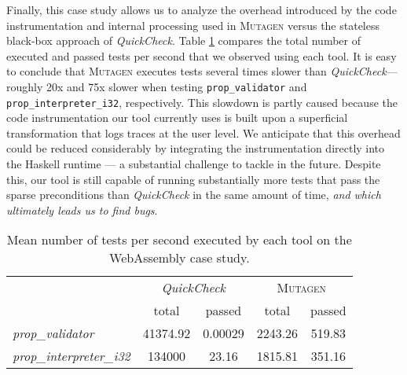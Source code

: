\documentclass[sigconf, anonymous, review]{acmart}
\newcommand{\quickcheck}{\textit{QuickCheck}\xspace}
\newcommand{\mutagen}{\textsc{Mutagen}\xspace}
\begin{document}
Finally, this case study allows us to analyze the overhead introduced by the
code instrumentation and internal processing used in \mutagen versus the
stateless black-box approach of \quickcheck.
%
Table \ref{table:wasm:overhead} compares the total number of executed and passed
tests per second that we observed using each tool.
%
It is easy to conclude that \mutagen executes tests several times slower than
\quickcheck --- roughly 20x and 75x slower when testing \texttt{prop\_validator}
and \texttt{prop\_interpreter\_i32}, respectively.
%
This slowdown is partly caused because the code instrumentation our tool
currently uses is built upon a superficial transformation that logs traces at
the user level.
%
We anticipate that this overhead could be reduced considerably by integrating
the instrumentation directly into the Haskell runtime --- a substantial
challenge to tackle in the future.
%
Despite this, our tool is still capable of running substantially more tests that
pass the sparse preconditions than \quickcheck in the same amount of time,
\emph{and which ultimately leads us to find bugs}.

\begin{table}
\footnotesize
\begin{tabular}{|l|c|c|c|c|}
\hline
\multicolumn{1}{|c|}{
  \multirow{2}{*}{Property}}
  & \multicolumn{2}{c|}{\quickcheck}
  & \multicolumn{2}{c|}{\mutagen} \\
  \cline{2-5}
  \multicolumn{1}{|c|}{}
  & \multicolumn{1}{c|}{total}
  & passed
  & \multicolumn{1}{c|}{total}
  & passed \\
\hline
\textit{prop\_validator}
& 41374.92
& 0.00029
& 2243.26
& 519.83\\
\hline
\textit{prop\_interpreter\_i32}
& 134000
& 23.16
& 1815.81
& 351.16 \\
\hline
\end{tabular}
\caption{\label{table:wasm:overhead}Mean number of tests per second executed by
  each tool on the WebAssembly case study.}
\vspace{-10pt}
\end{table}



\end{document}
